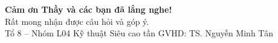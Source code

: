 \documentclass[aspectratio=169,10pt]{beamer}
\begin{document}
\begin{frame}[plain]
  \vfill
  \begin{center}
    {\Huge\bfseries Cảm ơn Thầy và các bạn đã lắng nghe!}\\[14pt]
    {\large Rất mong nhận được câu hỏi và góp ý.}\\[18pt]
    {\small\color{gray} Tổ 8 -- Nhóm L04 \quad\textbar\quad Kỹ thuật Siêu cao tần \quad\textbar\quad GVHD: TS. Nguyễn Minh Tân}
  \end{center}
  \vfill
\end{frame}
\end{document}
